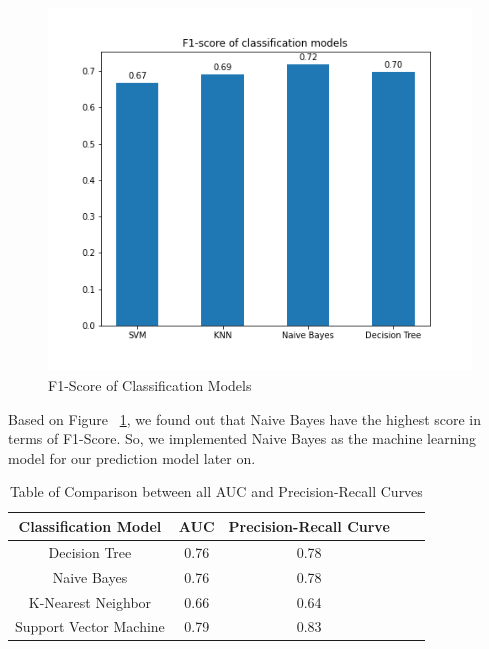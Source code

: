 \documentclass[11pt]{article}
\begin{document}
\begin{figure}[h]
\centerline{\includegraphics[scale=0.65]{classificationModel.png}}
\caption{F1-Score of Classification Models}
\label{fig:modelEvaluation}
\end{figure}

Based on Figure ~\ref{fig:modelEvaluation}, we found out that Naive Bayes have the highest score in terms of F1-Score. So, we implemented Naive Bayes as the machine learning model for our prediction model later on. 

\begin{table}[ht]
\centering
\caption{\label{tab:f1Metrics}Table of Comparison between all AUC and Precision-Recall Curves}
\begin{adjustbox}{width=1\textwidth}
\begin{tabular}{|c|c|c|c|c|}
\hline
\textbf{Classification Model} & \textbf{AUC} & \textbf{Precision-Recall Curve}\\ \hline
Decision Tree & 0.76 & 0.78\\ \hline
Naive Bayes & 0.76 & 0.78\\ \hline
K-Nearest Neighbor & 0.66 & 0.64\\ \hline
Support Vector Machine & 0.79 & 0.83\\ \hline
\end{tabular}
\end{adjustbox}
\end{table}
\end{document}
